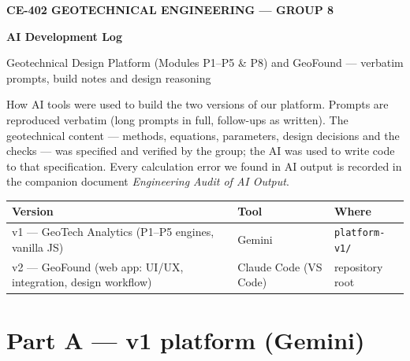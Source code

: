 \documentclass[11pt,a4paper]{article}
\newcommand{\code}[1]{\texttt{\small #1}}
\begin{document}
{\small\bfseries\color{accent}CE-402 GEOTECHNICAL ENGINEERING --- GROUP 8}\par
{\LARGE\bfseries AI Development Log}\par
{\color{black!65}Geotechnical Design Platform (Modules P1--P5 \& P8) and GeoFound --- verbatim prompts, build notes and design reasoning}\par
\vspace{2pt}{\color{navy}\rule{\textwidth}{1.5pt}}

How AI tools were used to build the two versions of our platform. Prompts are reproduced verbatim (long prompts in
full, follow-ups as written). The geotechnical content --- methods, equations, parameters, design decisions and the
checks --- was specified and verified by the group; the AI was used to write code to that specification. Every
calculation error we found in AI output is recorded in the companion document \emph{Engineering Audit of AI Output}.

\begin{center}
\begin{tabularx}{\textwidth}{>{\raggedright}p{}lX}
\toprule
\textbf{Version} & \textbf{Tool} & \textbf{Where} \\
\midrule
v1 --- GeoTech Analytics (P1--P5 engines, vanilla JS) & Gemini & \code{platform-v1/} \\
v2 --- GeoFound (web app: UI/UX, integration, design workflow) & Claude Code (VS Code) & repository root \\
\bottomrule
\end{tabularx}
\end{center}

\section{Part A --- v1 platform (Gemini)}
\end{document}
